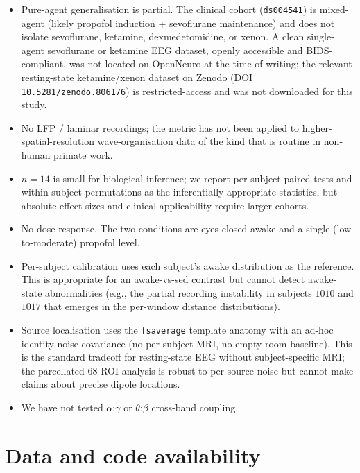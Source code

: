 \documentclass[11pt,a4paper]{article}
\begin{document}
\begin{itemize}\itemsep0pt
\item Pure-agent generalisation is partial. The clinical cohort (\texttt{ds004541}) is mixed-agent (likely propofol induction + sevoflurane maintenance) and does not isolate sevoflurane, ketamine, dexmedetomidine, or xenon. A clean single-agent sevoflurane or ketamine EEG dataset, openly accessible and BIDS-compliant, was not located on OpenNeuro at the time of writing; the relevant resting-state ketamine/xenon dataset on Zenodo (DOI \texttt{10.5281/zenodo.806176}) is restricted-access and was not downloaded for this study.
\item No LFP / laminar recordings; the metric has not been applied to higher-spatial-resolution wave-organisation data of the kind that is routine in non-human primate work.
\item $n=14$ is small for biological inference; we report per-subject paired tests and within-subject permutations as the inferentially appropriate statistics, but absolute effect sizes and clinical applicability require larger cohorts.
\item No dose-response. The two conditions are eyes-closed awake and a single (low-to-moderate) propofol level.
\item Per-subject calibration uses each subject's awake distribution as the reference. This is appropriate for an awake-vs-sed contrast but cannot detect awake-state abnormalities (e.g., the partial recording instability in subjects $1010$ and $1017$ that emerges in the per-window distance distributions).
\item Source localisation uses the \texttt{fsaverage} template anatomy with an ad-hoc identity noise covariance (no per-subject MRI, no empty-room baseline). This is the standard tradeoff for resting-state EEG without subject-specific MRI; the parcellated $68$-ROI analysis is robust to per-source noise but cannot make claims about precise dipole locations.
\item We have not tested $\alpha$:$\gamma$ or $\theta$:$\beta$ cross-band coupling.
\end{itemize}

\section{Data and code availability}
\end{document}
